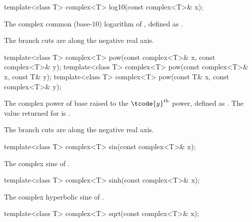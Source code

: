 %
\begin{itemdecl}
template<class T> complex<T> log10(const complex<T>& x);
\end{itemdecl}

\begin{itemdescr}
\pnum
\returns
The complex common (base-$10$) logarithm of , defined as
.

\pnum
\remarks
The branch cuts are along the negative real axis.
\end{itemdescr}

%
\begin{itemdecl}
template<class T> complex<T> pow(const complex<T>& x, const complex<T>& y);
template<class T> complex<T> pow(const complex<T>& x, const T& y);
template<class T> complex<T> pow(const T& x, const complex<T>& y);
\end{itemdecl}

\begin{itemdescr}
\pnum
\returns
The complex power of base  raised to the $\tcode{y}^\text{th}$ power,
defined as
.
The value returned for
is .

\pnum
\remarks
The branch cuts are along the negative real axis.
\end{itemdescr}

%
\begin{itemdecl}
template<class T> complex<T> sin(const complex<T>& x);
\end{itemdecl}

\begin{itemdescr}
\pnum
\returns
The complex sine of .
\end{itemdescr}

%
\begin{itemdecl}
template<class T> complex<T> sinh(const complex<T>& x);
\end{itemdecl}

\begin{itemdescr}
\pnum
\returns
The complex hyperbolic sine of .
\end{itemdescr}

%
\begin{itemdecl}
template<class T> complex<T> sqrt(const complex<T>& x);
\end{itemdecl}

